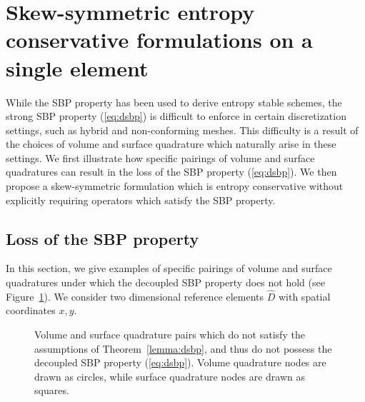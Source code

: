 \documentclass{svjour3}                     %
\renewcommand{\hat}{\widehat}
\begin{document}
\section{Skew-symmetric entropy conservative formulations on a single element}
\label{sec:skew1}
While the SBP property has been used to derive entropy stable schemes, the strong SBP property (\ref{eq:dsbp}) is difficult to enforce in certain discretization settings, such as hybrid and non-conforming meshes.  This difficulty is a result of the choices of volume and surface quadrature which naturally arise in these settings.  We first illustrate how specific pairings of volume and surface quadratures can result in the loss of the SBP property (\ref{eq:dsbp}).  We then propose a skew-symmetric formulation which is entropy conservative without explicitly requiring operators which satisfy the SBP property.  

\subsection{Loss of the SBP property}

In this section, we give examples of specific pairings of volume and surface quadratures under which the decoupled SBP property does not hold (see Figure~\ref{fig:sbploss}).  We consider two dimensional reference elements $\hat{D}$ with spatial coordinates $x,y$.
\begin{figure}
\centering
{}
\hspace{2em}
\caption{Volume and surface quadrature pairs which do not satisfy the assumptions of Theorem~\ref{lemma:dsbp}, and thus do not possess the decoupled SBP property (\ref{eq:dsbp}). Volume quadrature nodes are drawn as circles, while surface quadrature nodes are drawn as squares.}
\label{fig:sbploss}
\end{figure}
\end{document}
